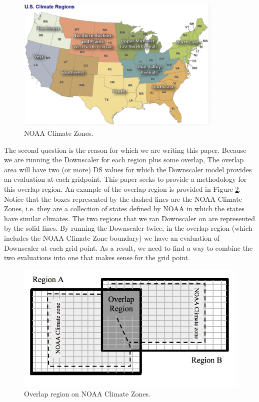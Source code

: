 \begin{figure} %
\begin{center}
  \includegraphics[width=3.9in]{ContUS.png}
\end{center}
\vspace{-0.15truein}
\caption{NOAA Climate Zones.}
\label{US}
\hspace{1.70in}
\vspace{-0.15truein}
\end{figure}

The second question is the reason for which we are writing this paper.  Because we are running the Downscaler for each region plus some overlap, The overlap area will have two (or more) DS values for which the Downscaler model provides an evaluation at each gridpoint.  This paper seeks to provide a methodology for this overlap region.  An example of the overlap region is provided in Figure \ref{overlap}.  Notice that the boxes represented by the dashed lines are the NOAA Climate Zones, i.e. they are a collection of states defined by NOAA in which the states have similar climates.  The two regions that we ran Downscaler on are represented by the solid lines.  By running the Downscaler twice, in the overlap region (which includes the NOAA Climate Zone boundary) we have an evaluation of Downscaler at each grid point.  As a result, we need to find a way to combine the two evaluations into one that makes sense for the grid point.

\begin{figure} %
\begin{center}
  \includegraphics[width=5.9in]{overlap.png}
\end{center}
\vspace{-0.15truein}
\caption{Overlap region on NOAA Climate Zones.}
\label{overlap}
\hspace{1.70in}
\vspace{-0.15truein}
\end{figure}